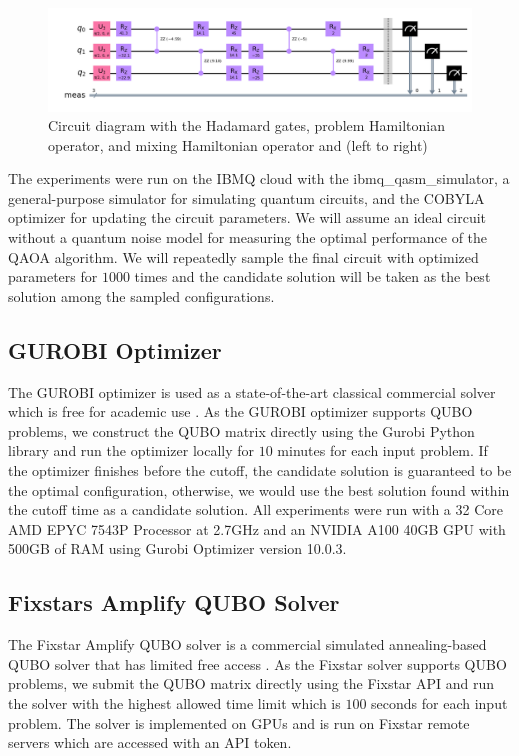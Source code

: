 \begin{figure}[h!]
    \centering
    \includegraphics[width=1\linewidth]{images/qiskit_circuit.png}
    \caption{Circuit diagram with the Hadamard gates, problem Hamiltonian operator, and mixing Hamiltonian operator and  (left to right)}
    \label{qiskitcircuit}
\end{figure}
The experiments were run on the IBMQ cloud with the ibmq\_qasm\_simulator, a general-purpose simulator for simulating quantum circuits, and the COBYLA optimizer for updating the circuit parameters. We will assume an ideal circuit without a quantum noise model for measuring the optimal performance of the QAOA algorithm. We will repeatedly sample the final circuit with optimized parameters for $1000$ times and the candidate solution will be taken as the best solution among the sampled configurations.


\subsection{GUROBI Optimizer}
The GUROBI optimizer is used as a state-of-the-art classical commercial solver which is free for academic use \cite{b26}. As the GUROBI optimizer supports QUBO problems, we construct the QUBO matrix directly using the Gurobi Python library and run the optimizer locally for $10$ minutes for each input problem. If the optimizer finishes before the cutoff, the candidate solution is guaranteed to be the optimal configuration, otherwise, we would use the best solution found within the cutoff time as a candidate solution. All experiments were run with a 32 Core AMD EPYC 7543P Processor at 2.7GHz and an NVIDIA A100 40GB GPU with 500GB of RAM using Gurobi Optimizer version 10.0.3.


\subsection{Fixstars Amplify QUBO Solver}
The Fixstar Amplify QUBO solver is a commercial simulated annealing-based QUBO solver that has limited free access \cite{b12}. As the Fixstar solver supports QUBO problems, we submit the QUBO matrix directly using the Fixstar API and run the solver with the highest allowed time limit which is $100$ seconds for each input problem. The solver is implemented on GPUs and is run on Fixstar remote servers which are accessed with an API token.

